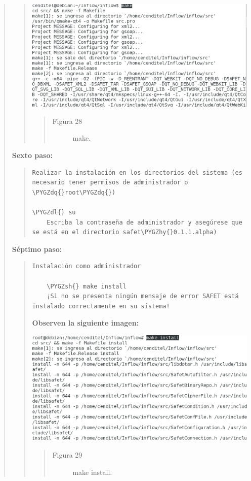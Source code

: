 \documentclass[letterpaper,11pt,spanish]{sphinxmanual}
\def\PYGZsh{\char`\#}
\def\PYGZdl{\char`\$}
\def\PYGZhy{\char`\-}
\def\PYGZdq{\char`\"}
\begin{document}
\begin{quote}
\begin{quote}
\includegraphics{inflow3.png}
\begin{quote}\begin{description}
\item[{Figura 28}] \leavevmode
make.

\end{description}\end{quote}
\end{quote}

\textbf{Sexto paso:}
\begin{quote}

\begin{Verbatim}[commandchars=\\\{\}]
   Realizar la instalación en los directorios del sistema (es necesario tener permisos de administrador o \PYGZdq{}root\PYGZdq{})

\PYGZdl{} su
    Escriba la contraseña de administrador y asegúrese que se está en el directorio safet\PYGZhy{}0.1.1.alpha)
\end{Verbatim}
\end{quote}

\textbf{Séptimo paso:}
\begin{quote}

\begin{Verbatim}[commandchars=\\\{\}]
Instalación como administrador

    \PYGZsh{} make install
    ¡Si no se presenta ningún mensaje de error SAFET está instalado correctamente en su sistema!
\end{Verbatim}

\textbf{Observen la siguiente imagen:}

\includegraphics{inflow4.png}
\begin{quote}\begin{description}
\item[{Figura 29}] \leavevmode
make install.


\end{description}
\end{quote}
\end{quote}
\end{quote}
\end{document}
